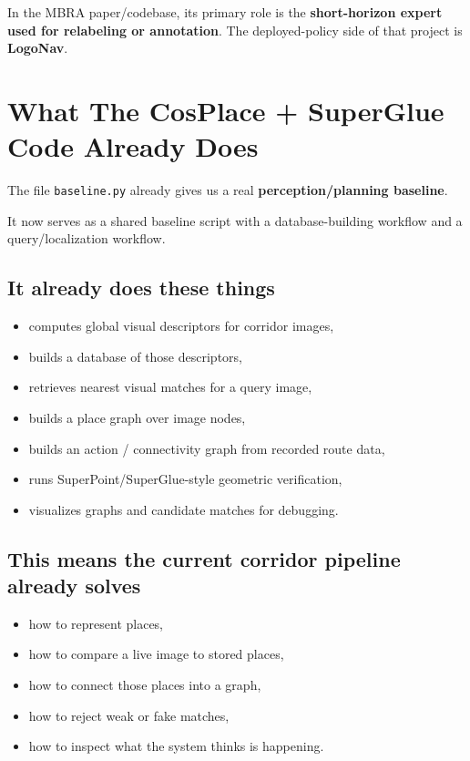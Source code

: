 \documentclass[11pt,a4paper]{article}
\begin{document}
In the MBRA paper/codebase, its primary role is the \textbf{short-horizon expert
used for relabeling or annotation}. The deployed-policy side of that project is
\textbf{LogoNav}.


\section{What The CosPlace + SuperGlue Code Already Does}

The file \texttt{baseline.py} already gives us a real
\textbf{perception/planning baseline}.

It now serves as a shared baseline script with a database-building workflow and
a query/localization workflow.

\subsection*{It already does these things}

\begin{itemize}[nosep]
  \item computes global visual descriptors for corridor images,
  \item builds a database of those descriptors,
  \item retrieves nearest visual matches for a query image,
  \item builds a place graph over image nodes,
  \item builds an action / connectivity graph from recorded route data,
  \item runs SuperPoint/SuperGlue-style geometric verification,
  \item visualizes graphs and candidate matches for debugging.
\end{itemize}

\subsection*{This means the current corridor pipeline already solves}

\begin{itemize}[nosep]
  \item how to represent places,
  \item how to compare a live image to stored places,
  \item how to connect those places into a graph,
  \item how to reject weak or fake matches,
  \item how to inspect what the system thinks is happening.
\end{itemize}
\end{document}
